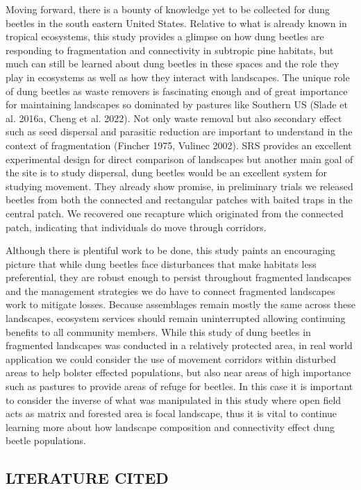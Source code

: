 \documentclass[
  man, donotrepeattitle]{apa6}
\begin{document}
Moving forward, there is a bounty of knowledge yet to be collected for dung beetles in the south eastern United States. Relative to what is already known in tropical ecosystems, this study provides a glimpse on how dung beetles are responding to fragmentation and connectivity in subtropic pine habitats, but much can still be learned about dung beetles in these spaces and the role they play in ecosystems as well as how they interact with landscapes. The unique role of dung beetles as waste removers is fascinating enough and of great importance for maintaining landscapes so dominated by pastures like Southern US (Slade et al. 2016a, Cheng et al. 2022). Not only waste removal but also secondary effect such as seed dispersal and parasitic reduction are important to understand in the context of fragmentation (Fincher 1975, Vulinec 2002). SRS provides an excellent experimental design for direct comparison of landscapes but another main goal of the site is to study dispersal, dung beetles would be an excellent system for studying movement. They already show promise, in preliminary trials we released beetles from both the connected and rectangular patches with baited traps in the central patch. We recovered one recapture which originated from the connected patch, indicating that individuals do move through corridors.

Although there is plentiful work to be done, this study paints an encouraging picture that while dung beetles face disturbances that make habitats less preferential, they are robust enough to persist throughout fragmented landscapes and the management strategies we do have to connect fragmented landscapes work to mitigate losses. Because assemblages remain mostly the same across these landscapes, ecosystem services should remain uninterrupted allowing continuing benefits to all community members. While this study of dung beetles in fragmented landscapes was conducted in a relatively protected area, in real world application we could consider the use of movement corridors within disturbed areas to help bolster effected populations, but also near areas of high importance such as pastures to provide areas of refuge for beetles. In this case it is important to consider the inverse of what was manipulated in this study where open field acts as matrix and forested area is focal landscape, thus it is vital to continue learning more about how landscape composition and connectivity effect dung beetle populations.

\subsection{LTERATURE CITED}\label{lterature-cited}
\end{document}
